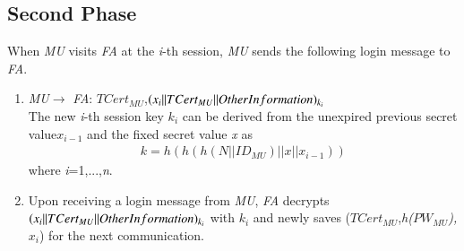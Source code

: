 \documentclass[letter]{ieice}%
\begin{document}
\subsection{Second Phase}%
\noindent When \emph{MU} visits \emph{FA} at the \emph{i}-th session, \emph{MU} sends the following login message to \emph{FA}.
\begin{enumerate}
  \item \emph{MU}$\rightarrow$ \emph{FA}: \emph{$TCert_{MU}$},$(x_i||\emph{$TCert_{MU}$}||Other Information)_{k_i}$\\
  The new \emph{i}-th session key \emph{$k_i$} can be derived from the unexpired previous secret value\emph{$x_{i-1}$} and the fixed secret value \emph{x} as%
  \begin{eqnarray}
  k=h(h(h(N||ID_{MU})||x||x_{i-1}))
  \end{eqnarray}
  where \emph{i}=1,...,\emph{n}.
  \item Upon receiving a login message from \emph{MU}, \emph{FA} decrypts
  $(x_i||\emph{$TCert_{MU}$}||Other Information)_{k_i}$ with $k_i$ and newly saves ($TCert_{MU}$,\emph{h($PW_{MU}$),$x_i$}) for the next communication.
\end{enumerate}
\end{document}
